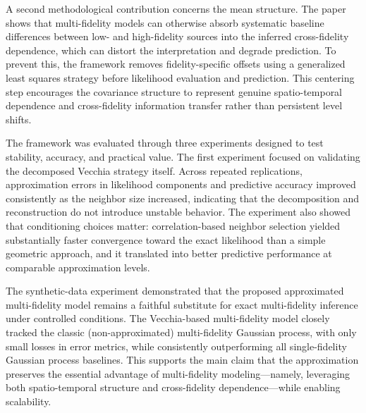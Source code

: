 \documentclass[12pt]{article}
\begin{document}
A second methodological contribution concerns the mean structure. The paper shows that multi-fidelity models can otherwise absorb systematic baseline differences between low- and high-fidelity sources into the inferred cross-fidelity dependence, which can distort the interpretation and degrade prediction. To prevent this, the framework removes fidelity-specific offsets using a generalized least squares strategy before likelihood evaluation and prediction. This centering step encourages the covariance structure to represent genuine spatio-temporal dependence and cross-fidelity information transfer rather than persistent level shifts.

The framework was evaluated through three experiments designed to test stability, accuracy, and practical value. The first experiment focused on validating the decomposed Vecchia strategy itself. Across repeated replications, approximation errors in likelihood components and predictive accuracy improved consistently as the neighbor size increased, indicating that the decomposition and reconstruction do not introduce unstable behavior. The experiment also showed that conditioning choices matter: correlation-based neighbor selection yielded substantially faster convergence toward the exact likelihood than a simple geometric approach, and it translated into better predictive performance at comparable approximation levels.

The synthetic-data experiment demonstrated that the proposed approximated multi-fidelity model remains a faithful substitute for exact multi-fidelity inference under controlled conditions. The Vecchia-based multi-fidelity model closely tracked the classic (non-approximated) multi-fidelity Gaussian process, with only small losses in error metrics, while consistently outperforming all single-fidelity Gaussian process baselines. This supports the main claim that the approximation preserves the essential advantage of multi-fidelity modeling—namely, leveraging both spatio-temporal structure and cross-fidelity dependence—while enabling scalability.
\end{document}
